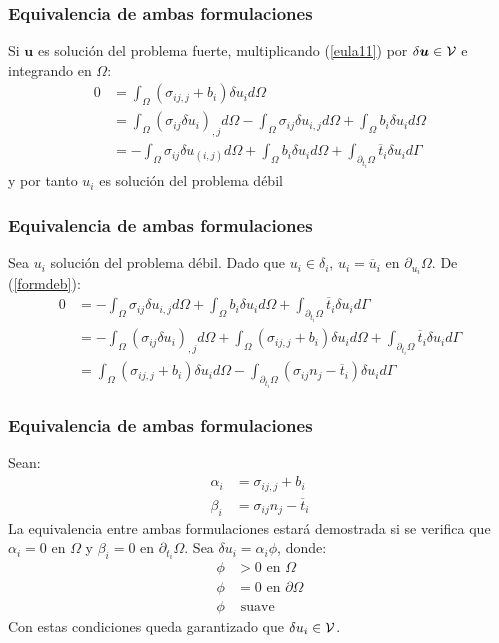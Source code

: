 \documentclass{beamer}
\begin{document}
\begin{frame}
\frametitle{Equivalencia de ambas formulaciones}
Si $\bm{u}$ es solución del problema fuerte, 
multiplicando (\ref{eula11}) por $\delta \bm{u} \in {\cal V}$ e integrando en
$\Omega$:
\begin{align}
0&= \int_{\Omega} (\sigma_{ij,j}+b_i)\delta u_i d\Omega \nonumber \\
 &= \int_{\Omega} (\sigma_{ij}\delta u_i)_{,j} d \Omega -
    \int_{\Omega}  \sigma_{ij}\delta u_{i,j} d \Omega +  
    \int_{\Omega} b_i \delta u_i d\Omega \nonumber \\
 &=-\int_{\Omega} \sigma_{ij}\delta u_{(i,j)} d \Omega +
    \int_{\Omega}  b_i \delta u_i d\Omega + 
    \int_{\partial_{t_i}\Omega}  \overline{t}_i \delta u_i d \Gamma
\end{align}
y por tanto $u_i$ es solución del problema débil
\end{frame}
\begin{frame}
\frametitle{Equivalencia de ambas formulaciones}
Sea $u_i$ solución del problema débil. Dado que $u_i \in \delta_i$, $u_i=
\overline{u}_i$ en $\partial_{u_i} \Omega$. De (\ref{formdeb}):
\begin{align}
0&=-\int_{\Omega} \sigma_{ij}\delta u_{i,j} d \Omega +
  \int_{\Omega}  b_i \delta u_i d\Omega +
  \int_{\partial_{t_i}\Omega}  \overline{t}_i \delta u_i d \Gamma \nonumber \\
 &=-\int_{\Omega} (\sigma_{ij}\delta u_i)_{,j} d \Omega +
  \int_{\Omega} (\sigma_{ij,j}+b_i)\delta u_i d \Omega +
  \int_{\partial_{t_i}\Omega}  \overline{t}_i \delta u_i d \Gamma \nonumber \\
 &= \int_{\Omega} (\sigma_{ij,j}+b_i)\delta u_i d \Omega -
  \int_{\partial_{t_i}\Omega}(\sigma_{ij}n_j-\overline{t}_i)\delta u_i d \Gamma
\label{demoeq}
\end{align}
\end{frame}
\begin{frame}
\frametitle{Equivalencia de ambas formulaciones}
Sean:
\begin{align}
\alpha_i&=\sigma_{ij,j}+b_i \\
\beta_i&=\sigma_{ij}n_j-\overline{t}_i
\end{align}
La equivalencia entre ambas formulaciones estará demostrada si se verifica
que $\alpha_i=0$ en $\Omega$ y $\beta_i=0$ en $\partial_{t_i} \Omega$.
Sea $\delta u_i=\alpha_i \phi$, donde:
\begin{align*}
\phi&>0 \textrm{ en } \Omega \\
\phi&=0 \textrm{ en } \partial \Omega \\
\phi& \textrm{ suave}
\end{align*}
Con estas condiciones queda garantizado que $\delta u_i \in {\cal V}$.
\end{frame}
\end{document}
